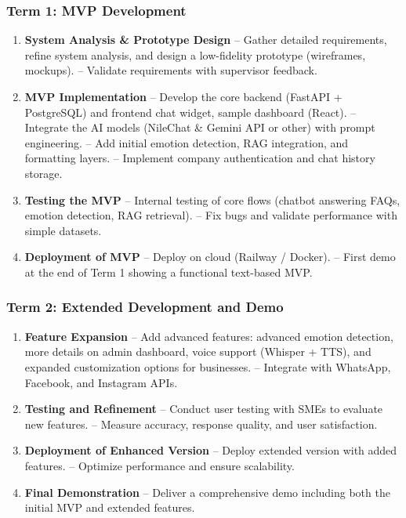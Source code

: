 \documentclass[12pt,a4paper]{article}
\begin{document}
\subsubsection*{Term 1: MVP Development}
\begin{enumerate}[leftmargin=*]
    \item \textbf{System Analysis \& Prototype Design}  
    -- Gather detailed requirements, refine system analysis, and design a low-fidelity prototype (wireframes, mockups).  
    -- Validate requirements with supervisor feedback.  

    \item \textbf{MVP Implementation}  
    -- Develop the core backend (FastAPI + PostgreSQL) and frontend chat widget, sample dashboard (React).  
    -- Integrate the AI models (NileChat \& Gemini API or other) with prompt engineering.  
    -- Add initial emotion detection, RAG integration, and formatting layers.  
    -- Implement company authentication and chat history storage.  

    \item \textbf{Testing the MVP}  
    -- Internal testing of core flows (chatbot answering FAQs, emotion detection, RAG retrieval).  
    -- Fix bugs and validate performance with simple datasets.  

    \item \textbf{Deployment of MVP}  
    -- Deploy on cloud (Railway / Docker).  
    -- First demo at the end of Term 1 showing a functional text-based MVP.  
\end{enumerate}

\subsubsection*{Term 2: Extended Development and Demo}
\begin{enumerate}[leftmargin=*]
    \item \textbf{Feature Expansion}  
    -- Add advanced features: advanced emotion detection, more details on admin dashboard, voice support (Whisper + TTS), and expanded customization options for businesses.  
    -- Integrate with WhatsApp, Facebook, and Instagram APIs.  

    \item \textbf{Testing and Refinement}  
    -- Conduct user testing with SMEs to evaluate new features.  
    -- Measure accuracy, response quality, and user satisfaction.  

    \item \textbf{Deployment of Enhanced Version}  
    -- Deploy extended version with added features.  
    -- Optimize performance and ensure scalability.  

    \item \textbf{Final Demonstration}  
    -- Deliver a comprehensive demo including both the initial MVP and extended features.  
\end{enumerate}
\end{document}
